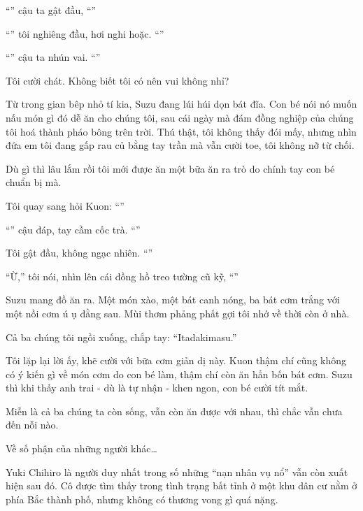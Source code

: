 \documentclass[../main.tex]{subfiles}
\begin{document}
``'' cậu ta gật đầu, ``''

``'' tôi nghiêng đầu, hơi nghi hoặc. ``''

``'' cậu ta nhún vai. ``''

Tôi cười chát. Không biết tôi có nên vui không nhỉ?

Từ trong gian bêp nhỏ tí kia, Suzu đang lúi húi dọn bát đĩa. Con bé nói nó muốn nấu món gì đó dễ ăn cho chúng tôi, sau cái ngày mà đám đồng nghiệp của chúng tôi hoá thành pháo bông trên trời. Thú thật, tôi không thấy đói mấy, nhưng nhìn đứa em tôi đang gấp rau củ bằng tay trần mà vẫn cười toe, tôi không nỡ từ chối.

Dù gì thì lâu lắm rồi tôi mới được ăn một bữa ăn ra trò do chính tay con bé chuẩn bị mà.

Tôi quay sang hỏi Kuon: ``''

``'' cậu đáp, tay cầm cốc trà. ``''

Tôi gật đầu, không ngạc nhiên. ``''

``Ừ,'' tôi nói, nhìn lên cái đồng hồ treo tường cũ kỹ, ``''

Suzu mang đồ ăn ra. Một món xào, một bát canh nóng, ba bát cơm trắng với một nồi cơm ú ụ đằng sau. Mùi thơm phảng phất gợi tôi nhớ về thời còn ở nhà.

Cả ba chúng tôi ngồi xuống, chắp tay: ``Itadakimasu.''

Tôi lặp lại lời ấy, khẽ cười với bữa cơm giản dị này. Kuon thậm chí cũng không có ý kiến gì về món cơm do con bé làm, thậm chí còn ăn hẳn bốn bát cơm. Suzu thì khi thấy anh trai - dù là tự nhận - khen ngon, con bé cười tít mắt.

Miễn là cả ba chúng ta còn sống, vẫn còn ăn được với nhau, thì chắc vẫn chưa đến nỗi nào.

\pov{-}

Về số phận của những người khác\dots

Yuki Chihiro là người duy nhất trong số những ``nạn nhân vụ nổ'' vẫn còn xuất hiện sau đó. Cô được tìm thấy trong tình trạng bất tỉnh ở một khu dân cư nằm ở phía Bắc thành phố, nhưng không có thương vong gì quá nặng.
\end{document}

